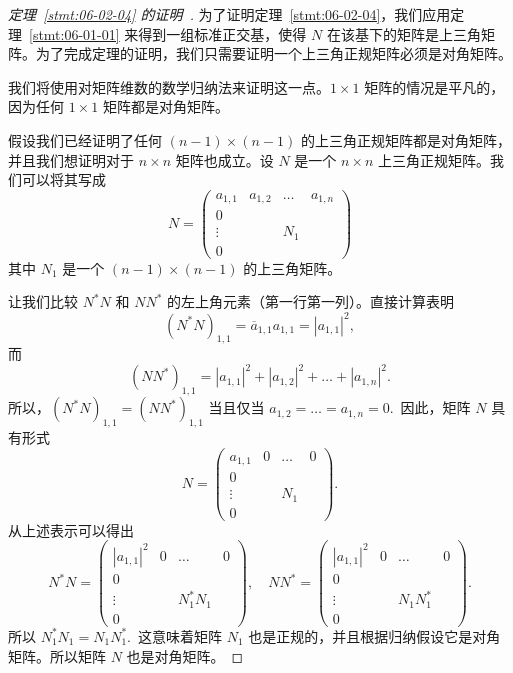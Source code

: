 \begin{proof}[\normalfont\heiti 定理~\ref{stmt:06-02-04} 的证明~\nopunct]为了证明定理~\ref{stmt:06-02-04}，我们应用定理~\ref{stmt:06-01-01} 来得到一组标准正交基，使得 $N$ 在该基下的矩阵是上三角矩阵。为了完成定理的证明，我们只需要证明一个上三角正规矩阵必须是对角矩阵。

我们将使用对矩阵维数的数学归纳法来证明这一点。$1 \times 1$ 矩阵的情况是平凡的，因为任何 $1 \times 1$ 矩阵都是对角矩阵。

假设我们已经证明了任何 $(n-1) \times (n-1)$ 的上三角正规矩阵都是对角矩阵，并且我们想证明对于 $n \times n$ 矩阵也成立。设 $N$ 是一个 $n \times n$ 上三角正规矩阵。我们可以将其写成
$$
N = \left(\begin{array}{c|ccc}
a_{1,1} & a_{1,2} & \dots & a_{1,n} \\
\hline
0 & & & \\
\vdots & & N_1 & \\
0 & & &
\end{array}\right)
$$
其中 $N_1$ 是一个 $(n-1) \times (n-1)$ 的上三角矩阵。

让我们比较 $N^*N$ 和 $NN^*$ 的左上角元素（第一行第一列）。直接计算表明 $$(N^*N)_{1,1} = \overline{a}_{1,1}a_{1,1} = |a_{1,1}|^2,$$
而
$$(NN^*)_{1,1} = |a_{1,1}|^2 + |a_{1,2}|^2 + \dots + |a_{1,n}|^2.$$
所以，$(N^*N)_{1,1} = (NN^*)_{1,1}$ 当且仅当 $a_{1,2} = \dots = a_{1,n} = 0$.~因此，矩阵 $N$ 具有形式
$$
N = \left(\begin{array}{c|ccc}
a_{1,1} & 0 & \dots & 0 \\
\hline
0 & & & \\
\vdots & & N_1 & \\
0 & & &
\end{array}\right).
$$
从上述表示可以得出
$$
N^*N = \left(\begin{array}{c|ccc}
|a_{1,1}|^2 & 0 & \dots & 0 \\
\hline
0 & & & \\
\vdots & & N_1^*N_1 & \\
0 & & &
\end{array}\right), \quad
NN^* = \left(\begin{array}{c|ccc}
|a_{1,1}|^2 & 0 & \dots & 0 \\
\hline
0 & & & \\
\vdots & & N_1 N_1^* & \\
0 & & &
\end{array}\right).
$$
所以 $N_1^*N_1 = N_1N_1^*$.~这意味着矩阵 $N_1$ 也是正规的，并且根据归纳假设它是对角矩阵。所以矩阵 $N$ 也是对角矩阵。\end{proof}

